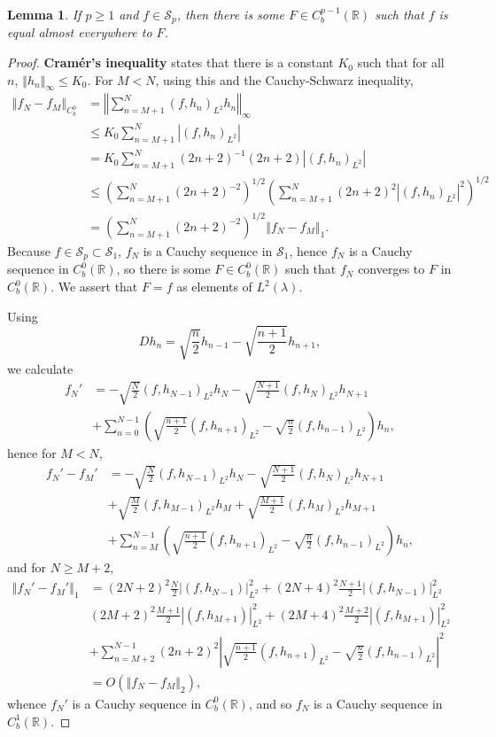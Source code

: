 \documentclass{article}
\newcommand{\norm}[1]{\left\Vert #1 \right\Vert}
\newtheorem{lemma}[theorem]{Lemma}
\theoremstyle{definition}
\begin{document}
\begin{lemma}
If $p \geq 1$ and $f \in \mathscr{S}_p$, then there is some $F \in C_b^{p-1}(\mathbb{R})$ such that
$f$ is equal almost everywhere to $F$.
\label{cramer}
\end{lemma}
\begin{proof}
\textbf{Cram\'er's inequality} states that there is a constant $K_0$ such that for all
$n$, $\norm{h_n}_\infty \leq K_0$. 
For $M < N$, using this and the Cauchy-Schwarz inequality,
\begin{align*}
\norm{f_N-f_M}_{C_b^0}&=\norm{ \sum_{n=M+1}^N (f,h_n)_{L^2} h_n}_\infty\\
&\leq K_0 \sum_{n=M+1}^N |(f,h_n)_{L^2}|\\
&= K_0 \sum_{n=M+1}^N (2n+2)^{-1} (2n+2)  |(f,h_n)_{L^2}|\\
&\leq \left( \sum_{n=M+1}^N (2n+2)^{-2}\right)^{1/2} 
\left( \sum_{n=M+1}^N (2n+2)^2   |(f,h_n)_{L^2}|^2 \right)^{1/2}\\
&= \left( \sum_{n=M+1}^N (2n+2)^{-2}\right)^{1/2} \norm{f_N-f_M}_1.
\end{align*}
Because $f \in \mathscr{S}_p \subset \mathscr{S}_1$, $f_N$ is a Cauchy sequence in $\mathscr{S}_1$, hence
$f_N$ is a Cauchy sequence in $C_b^0(\mathbb{R})$, so there is some $F \in C_b^0(\mathbb{R})$ such that
$f_N$ converges to $F$ in $C_b^0(\mathbb{R})$. 
We assert that $F=f$ as elements of $L^2(\lambda)$.

Using
\[
Dh_n= \sqrt{\frac{n}{2}} h_{n-1}-\sqrt{\frac{n+1}{2}} h_{n+1},
\]
we calculate
\begin{align*}
f_N' &= -\sqrt{\frac{N}{2}} (f,h_{N-1})_{L^2} h_N - \sqrt{\frac{N+1}{2}} (f,h_N)_{L^2} h_{N+1}\\
&+\sum_{n=0}^{N-1} \left( \sqrt{\frac{n+1}{2}} (f,h_{n+1})_{L^2}  - \sqrt{\frac{n}{2}} (f,h_{n-1})_{L^2}\right)h_n,
\end{align*}
hence for $M<N$,
\begin{align*}
f_N'-f_M'&= -\sqrt{\frac{N}{2}} (f,h_{N-1})_{L^2} h_N - \sqrt{\frac{N+1}{2}} (f,h_N)_{L^2} h_{N+1}\\
& +\sqrt{\frac{M}{2}} (f,h_{M-1})_{L^2} h_M + \sqrt{\frac{M+1}{2}} (f,h_M)_{L^2} h_{M+1}\\
&+\sum_{n=M}^{N-1} \left( \sqrt{\frac{n+1}{2}} (f,h_{n+1})_{L^2}  - \sqrt{\frac{n}{2}} (f,h_{n-1})_{L^2}\right)h_n,
\end{align*}
and for $N \geq M+2$,
\begin{align*}
\norm{f_N'-f_M'}_{1}&=(2N+2)^2 \frac{N}{2} |(f,h_{N-1})|_{L^2}^2 +(2N+4)^2 \frac{N+1}{2} |(f,h_{N-1})|_{L^2}^2\\
&(2M+2)^2 \frac{M+1}{2} |(f,h_{M+1})|_{L^2}^2+(2M+4)^2 \frac{M+2}{2} |(f,h_{M+1})|_{L^2}^2\\
&+\sum_{n=M+2}^{N-1} (2n+2)^2 \left| \sqrt{\frac{n+1}{2}} (f,h_{n+1})_{L^2}  - \sqrt{\frac{n}{2}} (f,h_{n-1})_{L^2}\right|^2\\
&=O(\norm{f_N-f_M}_2),
\end{align*}
whence
$f_N'$ is a Cauchy sequence in $C_b^0(\mathbb{R})$, and so $f_N$ is a Cauchy sequence in $C_b^1(\mathbb{R})$. 
\end{proof}
\end{document}
